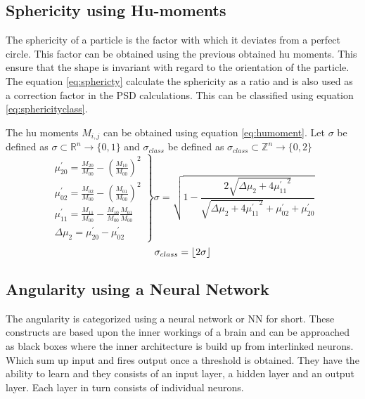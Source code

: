 \documentclass[11pt,fleqn,,a4paper,twoside,openright]{book}
\begin{document}
\subsection{Sphericity using Hu-moments} \label{HuMoments}
The sphericity of a particle is the factor with which it deviates from a perfect circle. This factor can be obtained using the previous obtained hu moments. This ensure that the shape is invariant with regard to the orientation of the particle.
The equation \ref{eq:sphericty} calculate the sphericity as a ratio and is also used as a correction factor in the PSD calculations. This can be classified using equation \ref{eq:sphericityclass}.
\begin{sBox}
	The hu moments $ M_{i,j} $ can be obtained using equation \ref{eq:humoment}. Let $\sigma $ be defined as $ \sigma \subset \mathbb{R}^n \rightarrow \{0, 1\} $ and $ \sigma_{class} $ be defined as $ \sigma_{class} \subset \mathbb{Z}^n \rightarrow \{0, 2\} $
	\begin{equation}\label{eq:sphericty}
	\left.
	\begin{array}{ll}
	\mu_{20}^{\prime} =\frac{M_{20}}{M_{00}} - \left(\frac{M_{10}}{M_{00}}\right)^2 \\[0.3cm]
	\mu_{02}^{\prime} =\frac{M_{02}}{M_{00}} - \left(\frac{M_{01}}{M_{00}}\right)^2 \\[0.3cm]
	\mu_{11}^{\prime} =\frac{M_{11}}{M_{00}} - \frac{M_{10}}{M_{00}} \frac{M_{01}}{M_{00}} \\[0.3cm]
	\Delta \mu_2 = \mu_{20}^{\prime} - \mu_{02}^{\prime}
	\end{array} \right\rbrace 	\sigma = \sqrt{1 - \frac{2 \sqrt{\Delta \mu_2 + 4 {\mu_{11}^{\prime}}^2}}{\sqrt{\Delta \mu_2 + 4 {\mu_{11}^{\prime}}^2} + \mu_{02}^{\prime} + \mu_{20}^{\prime}}}
	\end{equation}
	\begin{equation}\label{eq:sphericityclass}
	\sigma_{class} = \floor{2\sigma}
	\end{equation}
\end{sBox}

\subsection{Angularity using a Neural Network} \label{NeuralNet}
The angularity is categorized using a neural network or NN for short. These constructs are based upon the inner workings of a brain and can be approached as black boxes where the inner architecture is build up from interlinked neurons. Which sum up input and fires output once a threshold is obtained. They have the ability to learn and they consists of an input layer, a hidden layer and an output layer. Each layer in turn consists of individual neurons.
\end{document}
